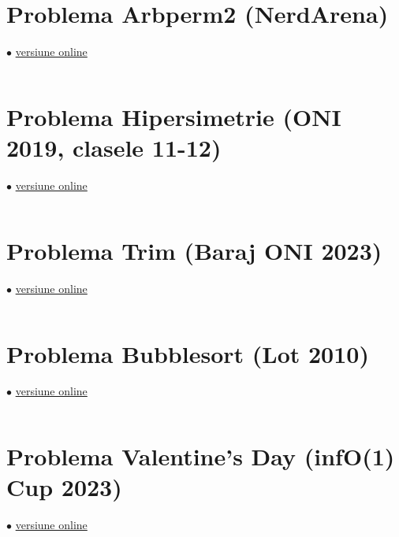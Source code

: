 \documentclass[../main.tex]{subfiles}
\begin{document}
\inputminted{cpp}{../src/math/long-permutation.cpp}

\section{Problema Arbperm2 (NerdArena)}
\label{code:arbperm2}
$\bullet$
\href{https://www.nerdarena.ro/job_detail/807914?action=view-source}{versiune online}

\inputminted{cpp}{../src/math/arbperm2.cpp}

\section{Problema Hipersimetrie (ONI 2019, clasele 11-12)}
\label{code:hipersimetrie}
$\bullet$
\href{https://kilonova.ro/submissions/316987}{versiune online}

\inputminted{cpp}{../src/math/hipersimetrie.cpp}

\section{Problema Trim (Baraj ONI 2023)}
\label{code:trim}
$\bullet$
\href{https://kilonova.ro/submissions/934764}{versiune online}

\inputminted{cpp}{../src/math/trim.cpp}

\section{Problema Bubblesort (Lot 2010)}
\label{code:bubblesort}
$\bullet$
\href{https://kilonova.ro/submissions/998908}{versiune online}

\inputminted{cpp}{../src/math/bubblesort.cpp}

\section{Problema Valentine's Day (infO(1) Cup 2023)}
\label{code:valentines-day}
$\bullet$
\href{https://kilonova.ro/submissions/552213}{versiune online}

\inputminted{cpp}{../src/math/valentines-day.cpp}
\end{document}
